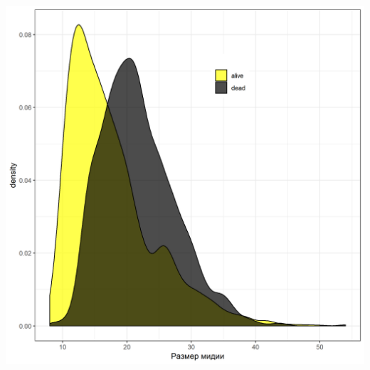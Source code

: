 \documentclass[20pt,a0,portrait]{a0poster}
\begin{document}
\begin{minipage}[t]{0.46\linewidth}		

\subsection*{}



%
\begin{minipage}[t]{0.46\linewidth}		
	\begin{center}\vspace{0.1cm}
			\includegraphics[width=0.9\linewidth]{Size_dist_hem.png}
			\label{Fig_siz_hem}
		\end{center}\vspace{0.5cm}
\end{minipage}\hspace{2cm}
%
\begin{minipage}[t]{0.46\linewidth}		
	\begin{center}\vspace{0.1cm}

\end{center}
\end{minipage}
\end{minipage}
\end{document}
